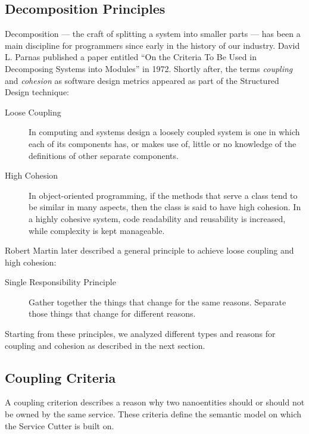 \subsection{Decomposition Principles}

Decomposition --- the craft of splitting a system into smaller parts --- has been a main discipline for programmers since early in the history of our industry. David L. Parnas published a paper entitled \enquote{On the Criteria To Be Used in Decomposing Systems into Modules} in 1972\cite{parnaDecomposing}. Shortly after, the terms \textit{coupling} 
and \textit{cohesion} as software design metrics appeared as part of the Structured Design technique\cite{structuredDesign}:

\begin{description}
	\item[Loose Coupling] In computing and systems design a loosely coupled system is one in which each of its components has, or makes use of, little or no knowledge of the definitions of other separate components.\cite{looseCoupling}
	\item[High Cohesion] In object-oriented programming, if the methods that serve a class tend to be similar in many aspects, then the class is said to have high cohesion. In a highly cohesive system, code readability and reusability is increased, while complexity is kept manageable.\cite{highCohesion}
\end{description}

Robert Martin later described a general principle to achieve loose coupling and high cohesion:

\begin{description}
	\item[Single Responsibility Principle] Gather together the things that change for the same reasons. Separate those things that change for different reasons.\cite{SRP}
\end{description}

Starting from these principles, we analyzed different types and reasons for coupling and cohesion as described in the next section.

\subsection{Coupling Criteria}
\label{sec:couplingCriteria}

A coupling criterion describes a reason why two nanoentities should or should not be owned by the same service. These criteria define the semantic model on which the Service Cutter is built on. 

